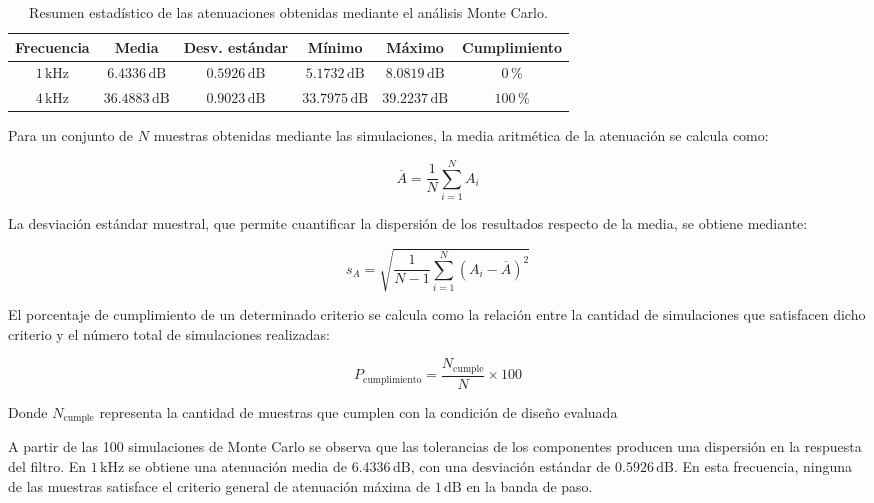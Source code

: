 \documentclass[12pt]{article}
\begin{document}
\begin{itemize}
\begin{table}[htbp]
    \centering
    \caption{Resumen estadístico de las atenuaciones obtenidas mediante el análisis Monte Carlo.}
    \label{tab:montecarlo_atenuacion}
    \begin{tabular}{c c c c c c}
        \hline
        Frecuencia & Media & Desv. estándar & Mínimo & Máximo & Cumplimiento \\
        \hline
        $1\,\text{kHz}$ & $6.4336\,\text{dB}$ & $0.5926\,\text{dB}$ 
        & $5.1732\,\text{dB}$ & $8.0819\,\text{dB}$ & $0\,\%$ \\

        $4\,\text{kHz}$ & $36.4883\,\text{dB}$ & $0.9023\,\text{dB}$ 
        & $33.7975\,\text{dB}$ & $39.2237\,\text{dB}$ & $100\,\%$ \\
        \hline
    \end{tabular}
\end{table}

Para un conjunto de \(N\) muestras obtenidas mediante las simulaciones, la media aritmética de la atenuación se calcula como:

\begin{equation}
    \overline{A} = \frac{1}{N}\sum_{i=1}^{N} A_i
    \label{eq:media_montecarlo}
\end{equation}

La desviación estándar muestral, que permite cuantificar la dispersión de los resultados respecto de la media, se obtiene mediante:

\begin{equation}
    s_A = \sqrt{
    \frac{1}{N-1}
    \sum_{i=1}^{N}
    \left(A_i-\overline{A}\right)^2
    }
    \label{eq:desviacion_montecarlo}
\end{equation}

El porcentaje de cumplimiento de un determinado criterio se calcula como la relación entre la cantidad de simulaciones que satisfacen dicho criterio y el número total de simulaciones realizadas:

\begin{equation}
    P_{\mathrm{cumplimiento}} =
    \frac{N_{\mathrm{cumple}}}{N}\times 100
    \label{eq:porcentaje_cumplimiento}
\end{equation}

Donde \(N_{\mathrm{cumple}}\) representa la cantidad de muestras que cumplen con la condición de diseño evaluada

A partir de las 100 simulaciones de Monte Carlo se observa que las
tolerancias de los componentes producen una dispersión en la respuesta
del filtro. En $1\,\text{kHz}$ se obtiene una atenuación media de
$6.4336\,\text{dB}$, con una desviación estándar de
$0.5926\,\text{dB}$. En esta frecuencia, ninguna de las muestras
satisface el criterio general de atenuación máxima de $1\,\text{dB}$
en la banda de paso.


\end{itemize}
\end{document}
